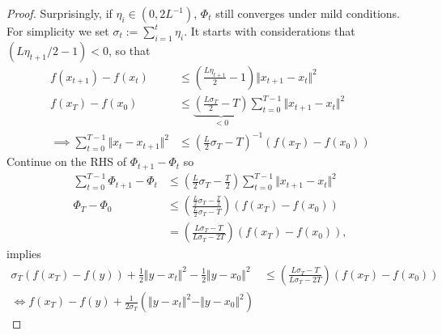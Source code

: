 \documentclass[12pt]{article}
\begin{document}
\begin{proof}
            Surprisingly, if $\eta_i \in (0, 2L^{-1})$, $\Phi_{t}$ still converges under mild conditions. 
            For simplicity we set $\sigma_t := \sum_{i = 1}^{t}\eta_i$. 
            It starts with considerations that $(L\eta_{t + 1}/2 - 1) < 0$, so that 
            \begin{align*}
                f(x_{t + 1}) - f(x_t) &\le 
                \left(\frac{L\eta_{t + 1}}{2} - 1\right)\Vert x_{t + 1} - x_t\Vert^2
                \\
                f(x_T) - f(x_0)
                &\le 
                \underbrace{
                \left(
                    \frac{L\sigma_T}{2} - T
                \right)
                }_{< 0}
                \sum_{t = 0}^{T - 1}\Vert x_{t + 1} - x_t\Vert^2
                \\
                \implies 
                \sum_{t = 0}^{T -1}\Vert x_t - x_{t + 1}\Vert^2
                &\le 
                \left(
                    \frac{L}{2}\sigma_T  - T
                \right)^{-1} 
                (f(x_T) - f(x_0))
            \end{align*}
            Continue on the RHS of $\Phi_{t + 1} - \Phi_t$ so 
            \begin{align*}
                \sum_{t = 0}^{T - 1}\Phi_{t + 1} - \Phi_t 
                &\le 
                \left(
                    \frac{L}{2}\sigma_T - \frac{T}{2}
                \right)\sum_{t = 0}^{T - 1}\Vert x_{t + 1} - x_t\Vert^2
                \\
                \Phi_T - \Phi_0 &\le 
                \left(
                    \frac{\frac{L}{2}\sigma_T - \frac{T}{2}}{
                        \frac{L}{2}\sigma_T - T
                    }
                \right)
                (f(x_T) - f(x_0))
                \\
                &= 
                \left(
                    \frac{L\sigma_T - T}{L\sigma_T - 2T}
                \right)
                (f(x_T) - f(x_0)), 
            \end{align*}
            implies
            \begin{align*}
                \sigma_T (f(x_T) - f(y)) + \frac{1}{2}\Vert y - x_t\Vert^2
                - \frac{1}{2}\Vert y - x_0 \Vert^2 
                &\le 
                \left(
                    \frac{L\sigma_T - T}{L\sigma_T - 2T}
                \right)
                (f(x_T) - f(x_0))
                \\
                \iff
                f(x_T) - f(y) + 
                \frac{1}{2\sigma_T}(\Vert y - x_t\Vert^2 - \Vert y - x_0\Vert^2)

\end{align*}
\end{proof}
\end{document}
